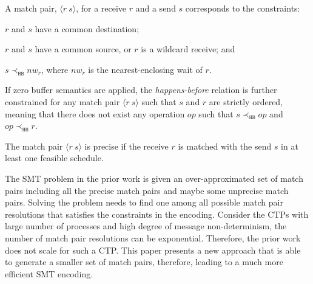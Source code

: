\begin{definition}
A match pair, $\langle r\ s\rangle$, for a receive $r$ and a send $s$ corresponds to the constraints:
\begin{compactenum}
\item $r$ and $s$ have a common destination;
\item $r$ and $s$ have a common source, or $r$ is a wildcard receive; and
\item $s \prec_{\mathtt{HB}} nw_r$, where $nw_r$ is the nearest-enclosing wait of $r$.
\end{compactenum}
\end{definition} 
If zero buffer semantics are applied, the \textit{happens-before} relation is further constrained for any match pair $\langle r\ s \rangle$ such that $s$ and $r$ are strictly ordered, meaning that there does not exist any operation $op$ such that $s \prec_{\mathtt{HB}} op$ and $op \prec_{\mathtt{HB}} r$. 

\begin{definition}
The match pair $\langle r\ s\rangle$ is precise if the receive $r$ is matched with the send $s$ in at least one feasible schedule.
\end{definition}


The SMT problem in the prior work is given an over-approximated set of match pairs including all the precise match pairs and maybe some unprecise match pairs. Solving the problem needs to find one among all possible match pair resolutions that satisfies the constraints in the encoding. Consider the CTPs with large number of processes and high degree of message non-determinism, the number of match pair resolutions can be exponential. Therefore, the prior work does not scale for such a CTP. This paper presents a new approach that is able to generate a smaller set of match pairs, therefore, leading to a much more efficient SMT encoding.






